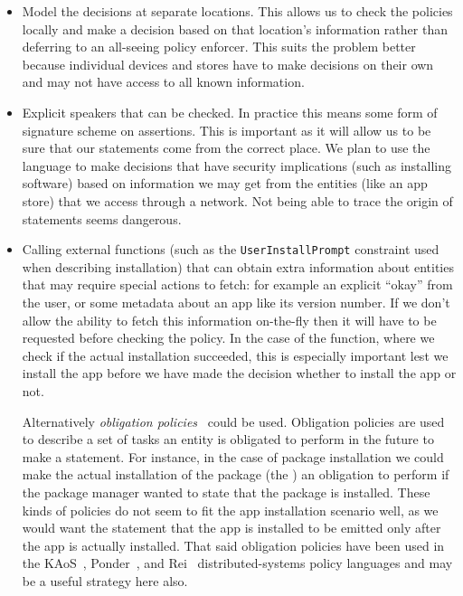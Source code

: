 \documentclass[a4paper]{article}
\begin{document}
\begin{itemize}

  \item Model the decisions at separate locations.  This allows us to check the
    policies locally and make a decision based on that location's information
    rather than deferring to an all-seeing policy enforcer.  This suits the
    problem better because individual devices and stores have to make decisions
    on their own and may not have access to all known information.

  \item Explicit speakers that can be checked. In practice this means some form
    of signature scheme on assertions.  This is important as it will allow us to
    be sure that our statements come from the correct place.  We plan to use the
    language to make decisions that have security implications (such as
    installing software) based on information we may get from the entities (like
    an app store) that we access through a network.  Not being able to trace the
    origin of statements seems dangerous.

  \item Calling external functions (such as the
    \texttt{UserInstallPrompt} constraint used when describing installation)
    that can obtain extra information about entities that may require special
    actions to fetch: for example an explicit ``okay'' from the user, or some
    metadata about an app like its version number.  If we don't allow the ability
    to fetch this information on-the-fly then it will have to be requested
    before checking the policy.  In the case of the  function,
    where we check if the actual installation succeeded, this is especially
    important lest we install the app before we have made the decision whether
    to install the app or not.  
    
    Alternatively \emph{obligation policies}~\cite{Gama:2005tp,Gelfond:2008cl}
    could be used.  Obligation policies are used to describe a set of tasks an
    entity is obligated to perform in the future to make a statement.  For
    instance, in the case of package installation we could make the actual
    installation of the package (the ) an
    obligation to perform if the package manager wanted to state that the
    package is installed.  These kinds of policies do not seem to fit the app
    installation scenario well, as we would want the statement that the app is
    installed to be emitted only after the app is actually installed.  That said
    obligation policies have been used in the KAoS~\cite{Uszok:2003bn},
    Ponder~\cite{Damianou:2001ho,Twidle:2009fj}, and Rei~\cite{Kagal:2002ta}
    distributed-systems policy languages and may be a useful strategy here also.


\end{itemize}
\end{document}
